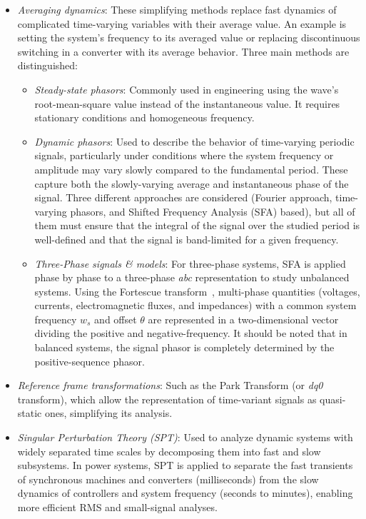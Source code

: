 \begin{itemize}
    \item \textit{Averaging dynamics}: These simplifying methods replace fast dynamics of complicated time-varying variables with their average value. 
    An example is setting the system's frequency to its averaged value or replacing discontinuous switching in a converter with its average behavior. 
    Three main methods are distinguished:
    \begin{itemize}
        \item \textit{Steady-state phasors}: Commonly used in engineering using the wave's root-mean-square value instead of the instantaneous value. 
        It requires stationary conditions and homogeneous frequency.
        \item \textit{Dynamic phasors}: Used to describe the behavior of time-varying periodic signals, particularly under conditions where the system frequency 
        or amplitude may vary slowly compared to the fundamental period. These capture both the slowly-varying average and instantaneous phase of the signal. 
        Three different approaches are considered (Fourier approach, time-varying phasors, and Shifted Frequency Analysis (SFA) based), 
        but all of them must ensure that the integral of the signal over the studied period is well-defined and that the signal is band-limited for a given frequency.
        \item \textit{Three-Phase signals \& models}: For three-phase systems, SFA is applied phase by phase to a three-phase \textit{abc} representation to study unbalanced systems. 
        Using the Fortescue transform~\cite{Fortescue}, multi-phase quantities (voltages, currents, electromagnetic fluxes, and impedances) with a common system frequency $w_s$ 
        and offset $\theta$ are represented in a two-dimensional vector dividing the positive and negative-frequency. 
        It should be noted that in balanced systems, the signal phasor is completely determined by the positive-sequence phasor.
    \end{itemize}

    \item \textit{Reference frame transformations}: Such as the Park Transform (or \textit{dq0} transform), which allow the representation of time-variant signals as quasi-static ones, simplifying its analysis.

    \item \textit{Singular Perturbation Theory (SPT)}: Used to analyze dynamic systems with widely separated time scales by decomposing them into fast and slow subsystems. 
    In power systems, SPT is applied to separate the fast transients of synchronous machines and converters (milliseconds) from the slow dynamics of controllers 
    and system frequency (seconds to minutes), enabling more efficient RMS and small-signal analyses.
\end{itemize}


